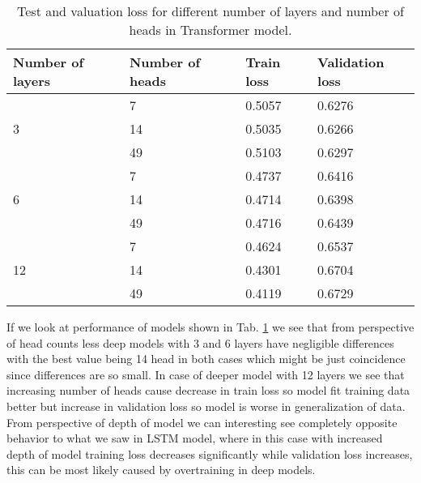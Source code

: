 \begin{table}[!h]
	\centering
	\begin{tabular}{|l|l|l|l|}
		\hline
		Number of layers    & Number of heads & Train loss & Validation loss \\ \hline
		\multirow{3}{*}{3}  & 7        &  0.5057         &  0.6276               \\ \cline{2-4} 
		& 14              &  0.5035         &  0.6266               \\ \cline{2-4} 
		& 49              &  0.5103         &  0.6297               \\ \hline
		\multirow{3}{*}{6}  & 7       & 0.4737          &  0.6416               \\ \cline{2-4} 
		& 14              &  0.4714         &  0.6398               \\ \cline{2-4} 
		& 49              &  0.4716         &  0.6439               \\ \hline
		\multirow{3}{*}{12} & 7       & 0.4624          & 0.6537                \\ \cline{2-4} 
		& 14              & 0.4301          &  0.6704               \\ \cline{2-4} 
		& 49              & 0.4119          &  0.6729               \\ \hline
	\end{tabular}
	\caption{Test and valuation loss for different number of layers and number of heads in Transformer model.}
	\label{tab:transformer_train}
\end{table}

If we look at performance of models shown in Tab. \ref{tab:transformer_train} we see that from perspective of head counts less deep models with 3 and 6 layers have negligible differences with the best value being 14 head in both cases which might be just coincidence since differences are so small. In case of deeper model with 12 layers we see that increasing number of heads cause decrease in train loss so model fit training data better but increase in validation loss so model is worse in generalization of data.
\\

From perspective of depth of model we can interesting see completely opposite behavior to what we saw in LSTM model, where in this case with increased depth of model training loss decreases significantly while validation loss increases, this can be most likely caused by overtraining in deep models.
\\

